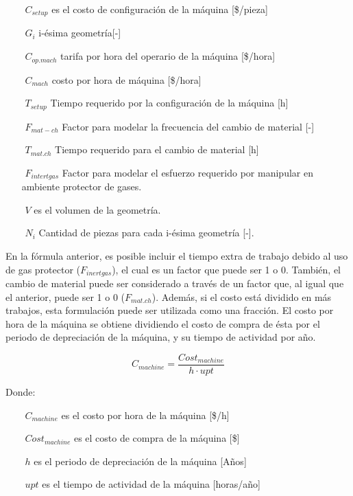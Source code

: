 \begin{description}
\begin{itemize}
\item[$ $] $C_{setup} $ es el costo de configuración de la máquina [\$/pieza]
\item[$ $] $G_i $ i-ésima geometría[-]
\item[$ $] $C_{op.mach} $ tarifa por hora del operario de la máquina [\$/hora]
\item[$ $] $C_{mach} $ costo por hora de máquina [\$/hora]
\item[$ $] $T_{setup} $ Tiempo requerido por la configuración de la máquina [h]
\item[$ $] $F_{mat-ch} $ Factor para modelar la frecuencia del cambio de material [-]
\item[$ $] $T_{mat.ch} $ Tiempo requerido para el cambio de material [h]
\item[$ $] $F_{intertgas} $ Factor para modelar el esfuerzo requerido por manipular en ambiente protector de gases.
\item[$ $] $V $ es el volumen de la geometría.
\item[$ $] $N_i$ Cantidad de piezas para cada i-ésima geometría [-].


\end{itemize}

En la fórmula anterior, es posible incluir el tiempo extra de trabajo debido al uso de gas protector ($F_{inertgas}$), el cual es un factor que puede ser 1 o 0. También, el cambio de material puede ser considerado a través de un factor que, al igual que el anterior, puede ser 1 o 0 ($F_{mat.ch}$). Además, si el costo está dividido en más trabajos, esta formulación puede ser utilizada como una fracción.
El costo por hora de la máquina se obtiene dividiendo el costo de compra de ésta por el periodo de depreciación de la máquina, y su tiempo de actividad por año. 

\begin{equation*}
C_{machine}=\frac{Cost_{machine}}{h\cdot upt}
\end{equation*}

Donde:

\begin{itemize}
\item[$ $] $C_{machine}$ es el costo por hora de la máquina [\$/h]
\item[$ $] $Cost_{machine}$ es el costo de compra de la máquina [\$]
\item[$ $] $h$ es el periodo de depreciación de la máquina [Años]
\item[$ $] $upt$ es el tiempo de actividad de la máquina [horas/año]


\end{itemize}
\end{description}

